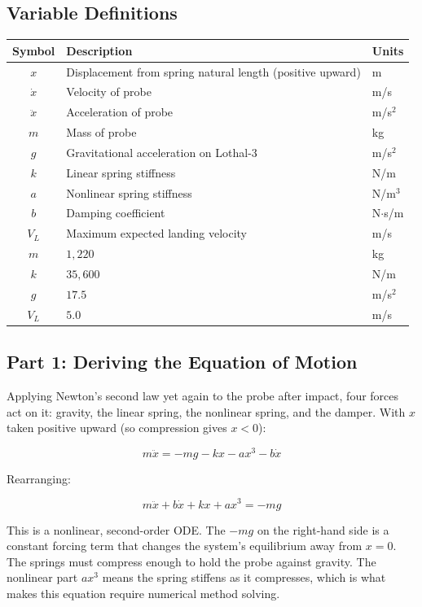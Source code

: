 \documentclass[12pt]{article}
\begin{document}
\subsection{Variable Definitions}

\begin{center}
\begin{tabular}{cll}
\toprule
Symbol & Description & Units \\
\midrule
$x$ & Displacement from spring natural length (positive upward) & m \\
$\dot{x}$ & Velocity of probe & m/s \\
$\ddot{x}$ & Acceleration of probe & m/s$^2$ \\
$m$ & Mass of probe & kg \\
$g$ & Gravitational acceleration on Lothal-3 & m/s$^2$ \\
$k$ & Linear spring stiffness & N/m \\
$a$ & Nonlinear spring stiffness & N/m$^3$ \\
$b$ & Damping coefficient & N$\cdot$s/m \\
$V_L$ & Maximum expected landing velocity & m/s \\
\midrule
$m$ & $1{,}220$ & kg \\
$k$ & $35{,}600$ & N/m \\
$g$ & $17.5$ & m/s$^2$ \\
$V_L$ & $5.0$ & m/s \\
\bottomrule
\end{tabular}
\end{center}

\subsection{Part 1: Deriving the Equation of Motion}

Applying Newton's second law yet again to the probe after impact, four forces act on it: gravity,
the linear spring, the nonlinear spring, and the damper. With $x$ taken positive upward
(so compression gives $x < 0$):

\[
    m\ddot{x} = -mg - kx - ax^3 - b\dot{x}
\]

Rearranging:

\[
    \boxed{m\ddot{x} + b\dot{x} + kx + ax^3 = -mg}
\]

This is a nonlinear, second-order ODE. The $-mg$ on the right-hand side is a constant forcing
term that changes the system's equilibrium away from $x = 0$. The springs must
compress enough to hold the probe against gravity. The nonlinear part $ax^3$ means the spring
stiffens as it compresses, which is what makes this equation require numerical method solving.
\end{document}
